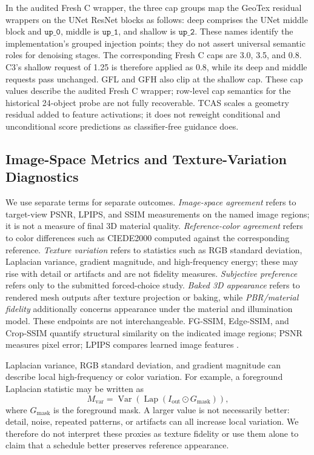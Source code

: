 \documentclass[times,twocolumn,final]{elsarticle}
\begin{document}
In the audited Fresh C wrapper, the three cap groups map the GeoTex residual wrappers on the UNet ResNet blocks as follows: deep comprises the UNet middle block and $\texttt{up\_0}$, middle is $\texttt{up\_1}$, and shallow is $\texttt{up\_2}$. These names identify the implementation's grouped injection points; they do not assert universal semantic roles for denoising stages. The corresponding Fresh C caps are 3.0, 3.5, and 0.8. C3's shallow request of 1.25 is therefore applied as 0.8, while its deep and middle requests pass unchanged. GFL and GFH also clip at the shallow cap. These cap values describe the audited Fresh C wrapper; row-level cap semantics for the historical 24-object probe are not fully recoverable. TCAS scales a geometry residual added to feature activations; it does not reweight conditional and unconditional score predictions as classifier-free guidance does.

\subsection{Image-Space Metrics and Texture-Variation Diagnostics}
\label{subsec:metrics}

We use separate terms for separate outcomes. \emph{Image-space agreement} refers to target-view PSNR, LPIPS, and SSIM measurements on the named image regions; it is not a measure of final 3D material quality. \emph{Reference-color agreement} refers to color differences such as CIEDE2000 computed against the corresponding reference. \emph{Texture variation} refers to statistics such as RGB standard deviation, Laplacian variance, gradient magnitude, and high-frequency energy; these may rise with detail or artifacts and are not fidelity measures. \emph{Subjective preference} refers only to the submitted forced-choice study. \emph{Baked 3D appearance} refers to rendered mesh outputs after texture projection or baking, while \emph{PBR/material fidelity} additionally concerns appearance under the material and illumination model. These endpoints are not interchangeable. FG-SSIM, Edge-SSIM, and Crop-SSIM quantify structural similarity on the indicated image regions; PSNR measures pixel error; LPIPS compares learned image features \cite{wang2004ssim,zhang2018lpips}.

Laplacian variance, RGB standard deviation, and gradient magnitude can describe local high-frequency or color variation. For example, a foreground Laplacian statistic may be written as
\begin{equation}
M_{\mathrm{var}}=\operatorname{Var}\!\left(\operatorname{Lap}(I_{\mathrm{out}}\odot G_{\mathrm{mask}})\right),
\end{equation}
where $G_{\mathrm{mask}}$ is the foreground mask. A larger value is not necessarily better: detail, noise, repeated patterns, or artifacts can all increase local variation. We therefore do not interpret these proxies as texture fidelity or use them alone to claim that a schedule better preserves reference appearance.
\end{document}
